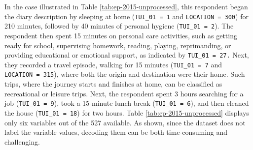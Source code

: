 \documentclass[Royal,times,sageh]{sagej}
\begin{document}
In the case illustrated in Table \ref{tab:ep-2015-unprocessed}, this
respondent began the diary description by sleeping at home
(\texttt{TUI\_01\ =\ 1} and \texttt{LOCATION\ =\ 300}) for 210 minutes,
followed by 40 minutes of personal hygiene (\texttt{TUI\_01\ =\ 2}). The
respondent then spent 15 minutes on personal care activities, such as
getting ready for school, supervising homework, reading, playing,
reprimanding, or providing educational or emotional support, as
indicated by \texttt{TUI\_01\ =\ 27.} Next, they recorded a travel
episode, walking for 15 minutes (\texttt{TUI\_01\ =\ 7} and
\texttt{LOCATION\ =\ 315}), where both the origin and destination were
their home. Such trips, where the journey starts and finishes at home,
can be classified as recreational or leisure trips. Next, the respondent
spent 3 hours searching for a job (\texttt{TUI\_01\ =\ 9}), took a
15-minute lunch break (\texttt{TUI\_01\ =\ 6}), and then cleaned the
house (\texttt{TUI\_01\ =\ 18}) for two hours. Table
\ref{tab:ep-2015-unprocessed} displays only six variables out of the 527
available. As shown, since the dataset does not label the variable
values, decoding them can be both time-consuming and challenging.

\begin{table}
\centering
\caption{\label{tab:gss-epi-file-2015}\label{tab:ep-2015-unprocessed}Visualization of the  first seven episodes of the record number 10041.}
\centering
{}
\end{table}
\end{document}
